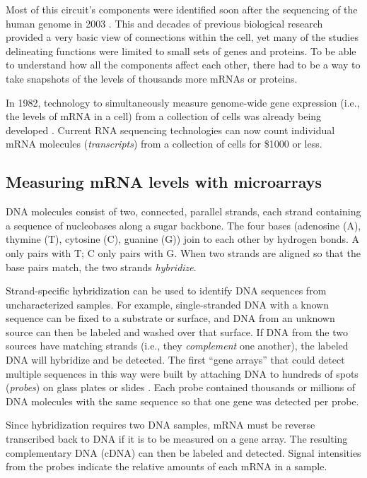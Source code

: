 Most of this circuit's components were identified soon after the
sequencing of the human genome in 2003 \cite{Consortium:2004bm,Gregory:2006tu}.
This and decades of previous biological research provided a very basic view
of connections within the cell, yet many of the studies delineating
functions were limited to small sets of genes and proteins.
To be able to understand how all the components affect each other,
there had to be a way to take snapshots of the levels of thousands more 
mRNAs or proteins.

In 1982, technology to simultaneously measure
genome-wide gene expression (i.e., the levels of mRNA in a cell)
from a collection of cells was already being developed \cite{Augenlicht:1982wo}. 
Current RNA sequencing technologies
can now count individual mRNA molecules (\textit{transcripts}) from a collection of cells
for \${}1000 or less.

\subsection{Measuring mRNA levels with microarrays}

DNA molecules consist of two, connected, parallel strands, each strand 
containing a sequence of nucleobases along a sugar backbone.
The four bases (adenosine (A), thymine (T), cytosine (C), guanine (G))
join to each other by hydrogen bonds. A only pairs with T; C only pairs with G.
When two strands are aligned so that the base pairs match, the two strands
\textit{hybridize}.

Strand-specific hybridization can be used to identify
DNA sequences from uncharacterized samples. For example, single-stranded DNA
with a known sequence
can be fixed to a substrate or surface, and DNA from an unknown
source can then be labeled and washed over that surface.
If DNA from the two sources have matching strands (i.e., they
\textit{complement} one another), the labeled
DNA will hybridize and be detected.
The first ``gene arrays'' that could detect multiple sequences in this way
were built by attaching 
DNA to hundreds of spots (\textit{probes}) on glass plates or 
slides \cite{Maskos:1992co, Augenlicht:1982wo}.
Each probe contained thousands or millions of DNA 
molecules with the same sequence so that one gene was detected per probe.

Since hybridization requires two DNA samples, mRNA must
be reverse transcribed back to DNA if it is to be measured on a gene array.
The resulting complementary DNA (cDNA)
can then be labeled and detected.
Signal intensities from the probes indicate the relative amounts of each
mRNA in a sample.


